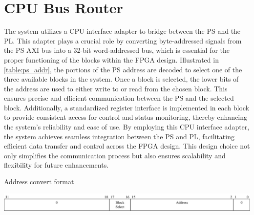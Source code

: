 \section{CPU Bus Router}

The system utilizes a CPU interface adapter to bridge between the PS and the PL. This adapter plays a crucial role by converting byte-addressed signals from the PS AXI bus into a 32-bit word-addressed bus, which is essential for the proper functioning of the blocks within the FPGA design. Illustrated in \autoref{table:ps_addr}, the portions of the PS address are decoded to select one of the three available blocks in the system. Once a block is selected, the lower bits of the address are used to either write to or read from the chosen block. This ensures precise and efficient communication between the PS and the selected block. Additionally, a standardized register interface is implemented in each block to provide consistent access for control and status monitoring, thereby enhancing the system's reliability and ease of use. By employing this CPU interface adapter, the system achieves seamless integration between the PS and PL, facilitating efficient data transfer and control across the FPGA design. This design choice not only simplifies the communication process but also ensures scalability and flexibility for future enhancements.

 
\begin{table}
\centering
\caption{Address convert format}
\includegraphics[width=1.0\textwidth]{figures/pc_address.png}
\label{table:ps_addr}
\end{table}

